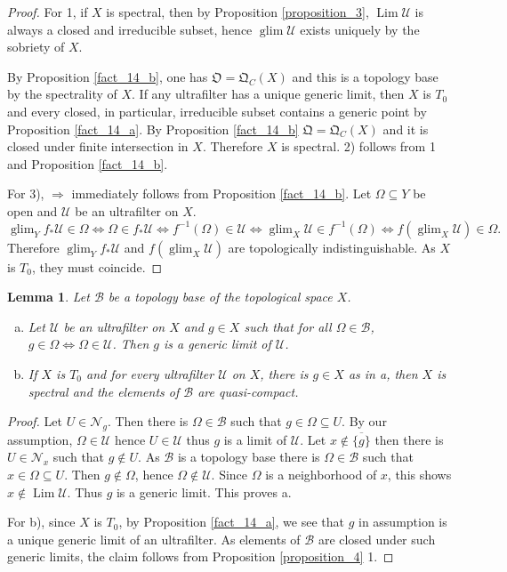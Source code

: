 \documentclass[8pt]{article}
\numberwithin{equation}{section}
\newtheorem{lemma}{Lemma}[subsection]
\DeclareMathOperator{\Lim}{Lim}
\DeclareMathOperator{\glim}{glim}
\newcommand{\U}[0]{\mathcal{U}}
\newcommand{\B}[0]{\mathcal{B}}
\newcommand{\Nfil}[0]{\mathcal{N}}
\newcommand{\QC}[0]{\mathfrak{Q}_C}
\begin{document}
\begin{proof}
    For 1, if $X$ is spectral, then by Proposition \ref{proposition_3}, $\Lim\U$ is always a closed and irreducible subset, hence $\glim\U$ exists uniquely by the sobriety of $X$. 
    \par By Proposition \ref{fact_14_b}, one has $\mathfrak{O}=\QC(X)$ and this is a topology base by the spectrality of $X$. If any ultrafilter has a unique generic limit, then $X$ is $T_0$ and every closed, in particular, irreducible subset contains a generic point by Proposition \ref{fact_14_a}. By Proposition \ref{fact_14_b} $\mathfrak{Q}=\QC(X)$ and it is closed under finite intersection
    in $X$. Therefore $X$ is spectral. 2) follows from 1 and Proposition \ref{fact_14_b}. 
    \par For 3), $\Rightarrow$ immediately follows from Proposition \ref{fact_14_b}. Let $\Omega\subseteq Y$ be open and $\U$ be an ultrafilter on $X$.
    \begin{equation*}
        \glim_Yf_*\U\in\Omega\Leftrightarrow \Omega\in f_*\U\Leftrightarrow f^{-1}(\Omega)\in\U\Leftrightarrow \glim_X\U\in f^{-1}(\Omega)\Leftrightarrow f(\glim_X\U)\in\Omega. 
    \end{equation*}
    Therefore $\glim_Yf_*\U$ and $f(\glim_X\U)$ are topologically indistinguishable. As $X$ is $T_0$, they must coincide.
\end{proof}

\begin{lemma}
    \label{lemma_1}
    Let $\mathcal{B}$ be a topology base of the topological space $X$.
    \begin{enumerate}[a)]
        \item Let $\U$ be an ultrafilter on $X$ and $g\in X$ such that for all $\Omega\in\mathcal{B}$, $g\in\Omega \Leftrightarrow\Omega\in\U$. Then $g$ is a generic limit of $\U$.
        \item If $X$ is $T_0$ and for every ultrafilter $\U$ on $X$, there is $g\in X$ as in a, then $X$ is spectral and the elements of $\B$ are quasi-compact.
    \end{enumerate}
\end{lemma}
\begin{proof}
    Let $U\in\Nfil_g$. Then there is $\Omega\in \B$ such that $g\in\Omega\subseteq U$. By our assumption, $\Omega\in\U$ hence $U\in\U$ thus $g$ is a limit of $\U$. 
    Let $x\not\in\overline{\{g\}}$ then there is $U\in\Nfil_x$ such that $g\not\in U$. As $\B$ is a topology base there is $\Omega\in\B$ such that $x\in\Omega\subseteq U$. Then $g\not\in \Omega$, hence $\Omega\not\in\U$. Since $\Omega$ is a neighborhood of $x$, this shows $x\not\in\Lim\U$. Thus $g$ is a generic limit. This proves a.
    \par For b), since $X$ is $T_0$, by Proposition \ref{fact_14_a}, we see that $g$ in assumption is a unique generic limit of an ultrafilter.  As elements of $\B$ are closed under such generic limits, the claim follows from Proposition \ref{proposition_4} 1.
\end{proof}
\end{document}
